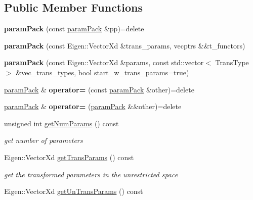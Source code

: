 \subsection*{Public Member Functions}
\begin{DoxyCompactItemize}
\item 
\mbox{\label{classparamPack_a404c1db9bb4ebc258ac79200e1b92cf9}} 
{\bfseries param\+Pack} (const \hyperlink{classparamPack}{param\+Pack} \&pp)=delete
\item 
\mbox{\label{classparamPack_a132baf34915216cae985ddcbff40cf75}} 
{\bfseries param\+Pack} (const Eigen\+::\+Vector\+Xd \&trans\+\_\+params, vecptrs \&\&t\+\_\+functors)
\item 
\mbox{\label{classparamPack_adc1cb981efe75da7e64fa279cd9ec467}} 
{\bfseries param\+Pack} (const Eigen\+::\+Vector\+Xd \&params, const std\+::vector$<$ Trans\+Type $>$ \&vec\+\_\+trans\+\_\+types, bool start\+\_\+w\+\_\+trans\+\_\+params=true)
\item 
\mbox{\label{classparamPack_a14b86328a0a82a7d00b631fd79884e94}} 
\hyperlink{classparamPack}{param\+Pack} \& {\bfseries operator=} (const \hyperlink{classparamPack}{param\+Pack} \&other)=delete
\item 
\mbox{\label{classparamPack_a7374a7e3ea39a54d020fc91a3d971ffd}} 
\hyperlink{classparamPack}{param\+Pack} \& {\bfseries operator=} (\hyperlink{classparamPack}{param\+Pack} \&\&other)=delete
\item 
unsigned int \hyperlink{classparamPack_a69fc36c50f73e6b827d2e339e2e8b806}{get\+Num\+Params} () const
\begin{DoxyCompactList}\small\item\em get number of parameters \end{DoxyCompactList}\item 
Eigen\+::\+Vector\+Xd \hyperlink{classparamPack_a384545f4e43c572c236b2535514830e3}{get\+Trans\+Params} () const
\begin{DoxyCompactList}\small\item\em get the transformed parameters in the unrestricted space \end{DoxyCompactList}\item 
Eigen\+::\+Vector\+Xd \hyperlink{classparamPack_afd45bfe2c0c9d157df3f146d57bc492d}{get\+Un\+Trans\+Params} () const

\end{DoxyCompactItemize}
